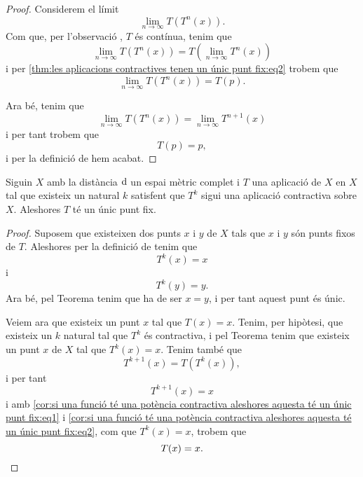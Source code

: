 \documentclass[../../Main.tex]{subfiles}
\begin{document}
\begin{theorem}
\begin{proof}
			Considerem el límit
			\[
			    \lim_{n\to\infty}T(T^{n}(x)).
			\]
			Com que, per l'observació , \(T\) és contínua, tenim que %
			\[
			    \lim_{n\to\infty}T(T^{n}(x))=T\left(\lim_{n\to\infty}T^{n}(x)\right)
			\]
			i per \eqref{thm:les aplicacions contractives tenen un únic punt fix:eq2} trobem que
			\[
			    \lim_{n\to\infty}T(T^{n}(x))=T(p).
			\]
			
			Ara bé, tenim que 
			\[
			    \lim_{n\to\infty}T(T^{n}(x))=\lim_{n\to\infty}T^{n+1}(x)
			\]
			i per tant trobem que
			\[
			    T(p)=p,
			\]
			i per la definició de  hem acabat.
		\end{proof}
	\end{theorem}
	\begin{corollary}
		\label{cor:si una funció té una potència contractiva aleshores aquesta té un únic punt fix}
		Siguin \(X\) amb la distància \(\operatorname{d}\) un espai mètric complet i \(T\) una aplicació de \(X\) en \(X\) tal que existeix un natural \(k\) satisfent que \(T^{k}\) sigui una aplicació contractiva sobre \(X\).
		Aleshores \(T\) té un únic punt fix.
		\begin{proof}
			Suposem que existeixen dos punts \(x\) i \(y\) de \(X\) tals que \(x\) i \(y\) són punts fixos de \(T\).
			Aleshores per la definició de  tenim que
			\[
			    T^{k}(x)=x
			\]
			i
			\[
			    T^{k}(y)=y.
			\]
			Ara bé, pel Teorema  tenim que ha de ser \(x=y\), i per tant aquest punt és únic.
			
			Veiem ara que existeix un punt \(x\) tal que \(T(x)=x\).
			Tenim, per hipòtesi, que existeix un \(k\) natural tal que \(T^{k}\) és contractiva, i pel Teorema  tenim que existeix un punt \(x\) de \(X\) tal que \(T^{k}(x)=x\).
			Tenim també que
			\begin{equation}
				\label{cor:si una funció té una potència contractiva aleshores aquesta té un únic punt fix:eq1}
				T^{k+1}(x)=T(T^{k}(x)),
			\end{equation}
			i per tant
			\begin{equation}
				\label{cor:si una funció té una potència contractiva aleshores aquesta té un únic punt fix:eq2}
				T^{k+1}(x)=x
			\end{equation}
			i amb \eqref{cor:si una funció té una potència contractiva aleshores aquesta té un únic punt fix:eq1} i \eqref{cor:si una funció té una potència contractiva aleshores aquesta té un únic punt fix:eq2}, com que \(T^{k}(x)=x\), trobem que
			\[
			    T(x)=x.\qedhere
			\]
		\end{proof}
	\end{corollary}
\end{document}
